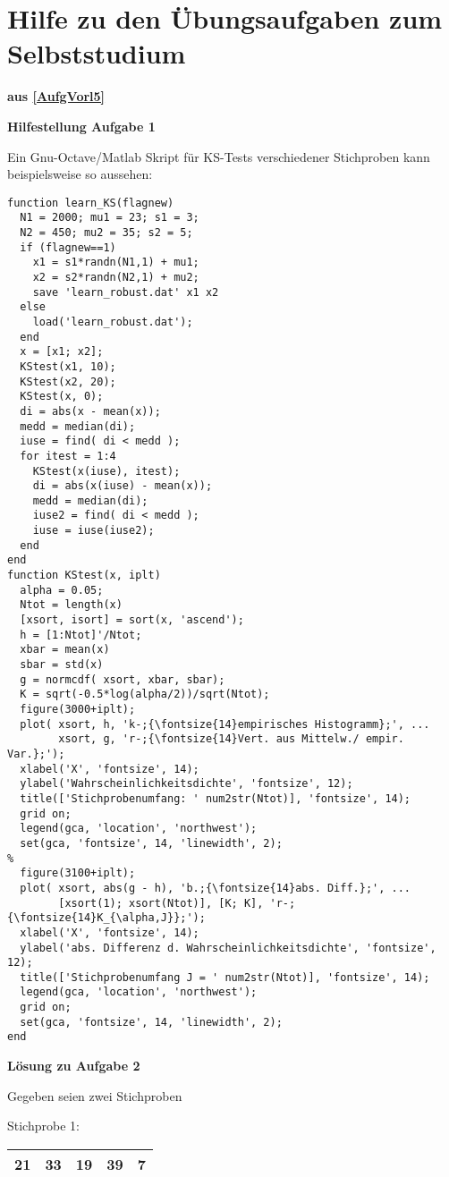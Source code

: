 \section{Hilfe zu den Übungsaufgaben zum Selbststudium}
\textbf{aus \ref{AufgVorl5}}

\textbf{\large Hilfestellung Aufgabe 1}

Ein Gnu-Octave/Matlab Skript für KS-Tests verschiedener Stichproben
kann beispielsweise so aussehen:
\begin{verbatim}
function learn_KS(flagnew)
  N1 = 2000; mu1 = 23; s1 = 3;
  N2 = 450; mu2 = 35; s2 = 5;
  if (flagnew==1)
    x1 = s1*randn(N1,1) + mu1;
    x2 = s2*randn(N2,1) + mu2;
    save 'learn_robust.dat' x1 x2
  else
    load('learn_robust.dat');
  end
  x = [x1; x2];
  KStest(x1, 10);
  KStest(x2, 20);
  KStest(x, 0);
  di = abs(x - mean(x));
  medd = median(di);
  iuse = find( di < medd );
  for itest = 1:4
    KStest(x(iuse), itest);
    di = abs(x(iuse) - mean(x));
    medd = median(di);
    iuse2 = find( di < medd );
    iuse = iuse(iuse2);
  end
end
function KStest(x, iplt)
  alpha = 0.05;
  Ntot = length(x)
  [xsort, isort] = sort(x, 'ascend');
  h = [1:Ntot]'/Ntot;
  xbar = mean(x)
  sbar = std(x)
  g = normcdf( xsort, xbar, sbar);
  K = sqrt(-0.5*log(alpha/2))/sqrt(Ntot);
  figure(3000+iplt);
  plot( xsort, h, 'k-;{\fontsize{14}empirisches Histogramm};', ...
        xsort, g, 'r-;{\fontsize{14}Vert. aus Mittelw./ empir. Var.};');
  xlabel('X', 'fontsize', 14);
  ylabel('Wahrscheinlichkeitsdichte', 'fontsize', 12);
  title(['Stichprobenumfang: ' num2str(Ntot)], 'fontsize', 14);
  grid on;
  legend(gca, 'location', 'northwest');
  set(gca, 'fontsize', 14, 'linewidth', 2);
%
  figure(3100+iplt);
  plot( xsort, abs(g - h), 'b.;{\fontsize{14}abs. Diff.};', ...
        [xsort(1); xsort(Ntot)], [K; K], 'r-;{\fontsize{14}K_{\alpha,J}};');
  xlabel('X', 'fontsize', 14);
  ylabel('abs. Differenz d. Wahrscheinlichkeitsdichte', 'fontsize', 12);
  title(['Stichprobenumfang J = ' num2str(Ntot)], 'fontsize', 14);
  legend(gca, 'location', 'northwest');
  grid on;
  set(gca, 'fontsize', 14, 'linewidth', 2);
end
\end{verbatim}

\textbf{\large Lösung zu Aufgabe 2}

Gegeben seien zwei Stichproben

Stichprobe 1:

\begin{tabular}{|c|c|c|c|c|}
\hline
21 & 33 & 19 & 39 & 7\\
\hline
\end{tabular}

